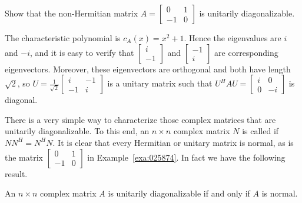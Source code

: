 \documentclass{ximera}
\begin{document}
\begin{example}\label{ex:025874}
Show that the non-Hermitian matrix $A = \left[ \begin{array}{rr}
0 & 1 \\
-1 & 0
\end{array}\right]$ is unitarily diagonalizable.


\begin{explanation}
  The characteristic polynomial is $c_{A}(x) = x^{2} + 1$. Hence the eigenvalues are $i$ and $-i$, and it is easy to verify that $\left[ \begin{array}{r}
  i \\
  -1
  \end{array}\right]$ and $\left[ \begin{array}{r}
  -1 \\
  i
  \end{array}\right]$ are corresponding eigenvectors. Moreover, these eigenvectors are orthogonal and both have length $\sqrt{2}$, so $U = \frac{1}{\sqrt{2}}\left[ \begin{array}{rr}
  i & -1 \\
  -1 & i
  \end{array}\right]$ is a unitary matrix such that $U^HAU = \left[ \begin{array}{rr}
  i & 0 \\
  0 & -i
  \end{array}\right]$ is diagonal.
\end{explanation}
\end{example}

There is a very simple way to characterize those complex matrices that are unitarily diagonalizable. To this end, an $n \times n$ complex matrix $N$ is called  if $NN^{H} = N^{H}N$. It is clear that every Hermitian or unitary matrix is normal, as is the matrix $\left[ \begin{array}{rr}
	0 & 1 \\
	-1 & 0
\end{array}\right]$ in Example~\ref{exa:025874}. In fact we have the following result.

\begin{theorem}\label{025890}
An $n \times n$ complex matrix $A$ is unitarily diagonalizable if and only if $A$ is normal.
\end{theorem}
\end{document}
